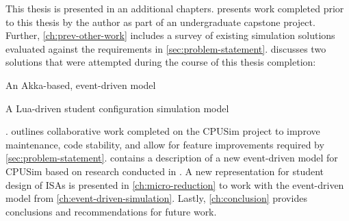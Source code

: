 This thesis is presented in an additional  chapters.  presents work completed prior to this thesis by the author as part of an undergraduate capstone project. Further, \cref{ch:prev-other-work} includes a survey of existing simulation solutions evaluated against the requirements in \cref{sec:problem-statement}.  discusses two solutions that were attempted during the course of this thesis completion: 
\begin{enumerate*}
    \item An Akka-based, event-driven model
    \item A Lua-driven student configuration simulation model
\end{enumerate*}. 
 outlines collaborative work completed on the CPUSim project to improve maintenance, code stability, and allow for feature improvements required by \cref{sec:problem-statement}.  contains a description of a new event-driven model for CPUSim based on research conducted in . A new representation for student design of ISAs is presented in \cref{ch:micro-reduction} to work with the event-driven model from \cref{ch:event-driven-simulation}. Lastly, \cref{ch:conclusion} provides conclusions and recommendations for future work. 
